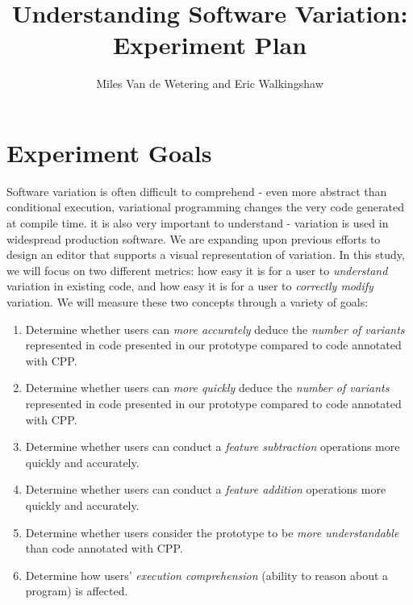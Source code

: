 \documentclass[11pt]{article}
\begin{document}
	
	\title{Understanding Software Variation: Experiment Plan}
	\author{Miles Van de Wetering and Eric Walkingshaw}
	\date{}
	\maketitle
	
	\section{Experiment Goals}
	\label{sec:goals}
	
	Software variation is often difficult to comprehend - even more abstract than conditional execution, variational programming changes the very code generated at compile time. it is also very important to understand - variation is used in widespread production software. We are expanding upon previous efforts to design an editor that supports a visual representation of variation. In this study, we will focus on two different metrics: how easy it is for a user to \emph{understand} variation in existing code, and how easy it is for a user to \emph{correctly modify} variation. We will measure these two concepts through a variety of goals:
	
	\begin{enumerate}[label=Goal \arabic*:,leftmargin=*]%
		
		\item Determine whether users can \emph{more accurately} deduce the
		\emph{number of variants} represented in code presented in our prototype
		compared to code annotated with CPP.
		
		\item Determine whether users can \emph{more quickly} deduce the \emph{number
			of variants} represented in code presented in our prototype compared to code
		annotated with CPP.
		
		\item Determine whether users can conduct a \emph{feature subtraction} operations more quickly and accurately.
		
		\item Determine whether users can conduct a \emph{feature addition} operations more quickly and accurately.
		
		\item Determine whether users consider the prototype to be \emph{more understandable} than code annotated with CPP.
		
		\item Determine how users' \emph{execution comprehension} (ability to reason about a program) is affected.
		
	\end{enumerate}
	
\end{document}
